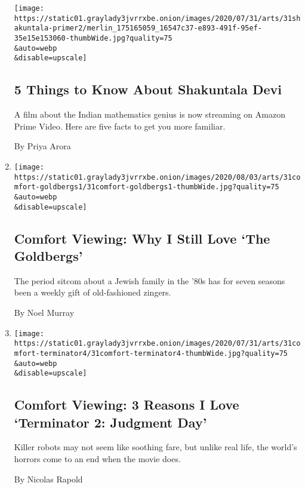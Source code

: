 \begin{enumerate}
  \texttt{[image: https://static01.graylady3jvrrxbe.onion/images/2020/07/31/arts/31shakuntala-primer2/merlin\_175165059\_16547c37-e893-491f-95ef-35e15e153060-thumbWide.jpg?quality=75\\\&auto=webp\\\&disable=upscale]}

  \hypertarget{5-things-to-know-about-shakuntala-devi}{%
  \subsection{5 Things to Know About Shakuntala
  Devi}\label{5-things-to-know-about-shakuntala-devi}}

  A film about the Indian mathematics genius is now streaming on Amazon
  Prime Video. Here are five facts to get you more familiar.

  By Priya Arora
\item
  \href{/2020/07/31/arts/television/goldbergs-abc-stream.html}{}

  \texttt{[image: https://static01.graylady3jvrrxbe.onion/images/2020/08/03/arts/31comfort-goldbergs1/31comfort-goldbergs1-thumbWide.jpg?quality=75\\\&auto=webp\\\&disable=upscale]}

  \hypertarget{comfort-viewing-why-i-still-love-the-goldbergs}{%
  \subsection{Comfort Viewing: Why I Still Love `The
  Goldbergs'}\label{comfort-viewing-why-i-still-love-the-goldbergs}}

  The period sitcom about a Jewish family in the '80s has for seven
  seasons been a weekly gift of old-fashioned zingers.

  By Noel Murray
\item
  \href{/2020/07/31/movies/comfort-viewing-terminator-2.html}{}

  \texttt{[image: https://static01.graylady3jvrrxbe.onion/images/2020/07/31/arts/31comfort-terminator4/31comfort-terminator4-thumbWide.jpg?quality=75\\\&auto=webp\\\&disable=upscale]}

  \hypertarget{comfort-viewing-3-reasons-i-love-terminator-2-judgment-day}{%
  \subsection{Comfort Viewing: 3 Reasons I Love `Terminator 2: Judgment
  Day'}\label{comfort-viewing-3-reasons-i-love-terminator-2-judgment-day}}

  Killer robots may not seem like soothing fare, but unlike real life,
  the world's horrors come to an end when the movie does.

  By Nicolas Rapold
\end{enumerate}

